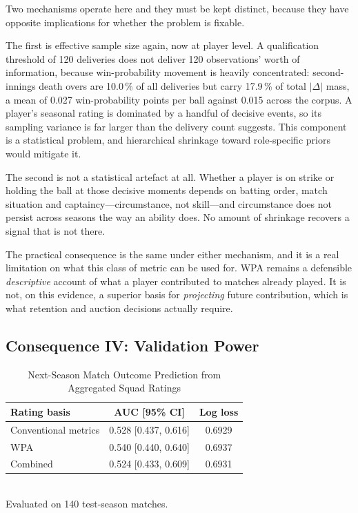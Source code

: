 \documentclass[conference]{IEEEtran}
\begin{document}
Two mechanisms operate here and they must be kept distinct, because they
have opposite implications for whether the problem is fixable.

The first is effective sample size again, now at player level. A
qualification threshold of 120 deliveries does not deliver 120
observations' worth of information, because win-probability movement is
heavily concentrated: second-innings death overs are 10.0\,\% of all
deliveries but carry 17.9\,\% of total $|\Delta|$ mass, a mean of 0.027
win-probability points per ball against 0.015 across the corpus. A
player's seasonal rating is dominated by a handful of decisive events,
so its sampling variance is far larger than the delivery count suggests.
This component is a statistical problem, and hierarchical shrinkage
toward role-specific priors would mitigate it.

The second is not a statistical artefact at all. Whether a player is on
strike or holding the ball at those decisive moments depends on batting
order, match situation and captaincy---circumstance, not skill---and
circumstance does not persist across seasons the way an ability does.
No amount of shrinkage recovers a signal that is not there.

The practical consequence is the same under either mechanism, and it is
a real limitation on what this class of metric can be used for. WPA
remains a defensible \emph{descriptive} account of what a player
contributed to matches already played. It is not, on this evidence, a
superior basis for \emph{projecting} future contribution, which is what
retention and auction decisions actually require.

\subsection{Consequence IV: Validation Power}

\begin{table}[htbp]
\caption{Next-Season Match Outcome Prediction from Aggregated Squad Ratings}
\label{tab:validity}
\centering
\begin{tabular}{lcc}
\toprule
\textbf{Rating basis} & \textbf{AUC [95\% CI]} & \textbf{Log loss} \\
\midrule
Conventional metrics & 0.528 [0.437, 0.616] & 0.6929 \\
WPA & 0.540 [0.440, 0.640] & 0.6937 \\
Combined & 0.524 [0.433, 0.609] & 0.6931 \\
\bottomrule
\end{tabular}
\\[2pt]\footnotesize Evaluated on 140 test-season matches.
\end{table}
\end{document}
